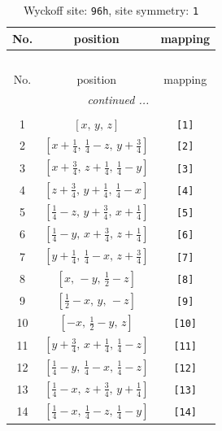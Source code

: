 \documentclass[fleqn,8pt]{jsarticle}
\begin{document}
\begin{longtable}{ccc}
\caption{Wyckoff site: {\tt 96h}, site symmetry: {\tt 1}}
 \\
 \hline \hline
No. & position & mapping \\ \hline \endfirsthead

\multicolumn{2}{l}{\tablename\ \thetable{}} \\
 \hline \hline
No. & position & mapping \\ \hline \endhead

 \hline \hline
\multicolumn{2}{r}{\footnotesize\it continued ...} \\ \endfoot

 \hline \hline
\multicolumn{2}{r}{} \\ \endlastfoot

1 & $\left[ x,\, y,\, z \right]$ & {\tt [1]} \\ \hline
2 & $\left[ x + \frac{1}{4},\, \frac{1}{4} - z,\, y + \frac{3}{4} \right]$ & {\tt [2]} \\ \hline
3 & $\left[ x + \frac{3}{4},\, z + \frac{1}{4},\, \frac{1}{4} - y \right]$ & {\tt [3]} \\ \hline
4 & $\left[ z + \frac{3}{4},\, y + \frac{1}{4},\, \frac{1}{4} - x \right]$ & {\tt [4]} \\ \hline
5 & $\left[ \frac{1}{4} - z,\, y + \frac{3}{4},\, x + \frac{1}{4} \right]$ & {\tt [5]} \\ \hline
6 & $\left[ \frac{1}{4} - y,\, x + \frac{3}{4},\, z + \frac{1}{4} \right]$ & {\tt [6]} \\ \hline
7 & $\left[ y + \frac{1}{4},\, \frac{1}{4} - x,\, z + \frac{3}{4} \right]$ & {\tt [7]} \\ \hline
8 & $\left[ x,\, - y,\, \frac{1}{2} - z \right]$ & {\tt [8]} \\ \hline
9 & $\left[ \frac{1}{2} - x,\, y,\, - z \right]$ & {\tt [9]} \\ \hline
10 & $\left[ - x,\, \frac{1}{2} - y,\, z \right]$ & {\tt [10]} \\ \hline
11 & $\left[ y + \frac{3}{4},\, x + \frac{1}{4},\, \frac{1}{4} - z \right]$ & {\tt [11]} \\ \hline
12 & $\left[ \frac{1}{4} - y,\, \frac{1}{4} - x,\, \frac{1}{4} - z \right]$ & {\tt [12]} \\ \hline
13 & $\left[ \frac{1}{4} - x,\, z + \frac{3}{4},\, y + \frac{1}{4} \right]$ & {\tt [13]} \\ \hline
14 & $\left[ \frac{1}{4} - x,\, \frac{1}{4} - z,\, \frac{1}{4} - y \right]$ & {\tt [14]} \\ \hline

\end{longtable}
\end{document}
